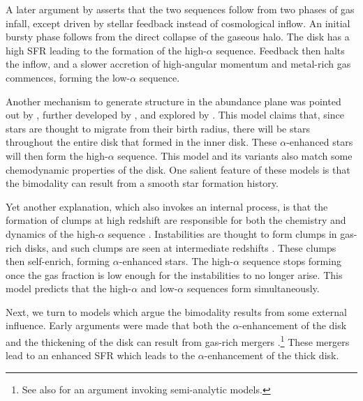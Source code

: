 \documentclass[linenumbers, twocolumn]{aastex631}
\begin{document}
A later argument by \citet{2021MNRAS.501.5176K} asserts that the two sequences follow from two phases of gas infall, except driven by stellar feedback instead of cosmological inflow. An initial bursty phase follows from the direct collapse of the gaseous halo. The disk has a high SFR leading to the formation of the high-$\alpha$ sequence. Feedback then halts the inflow, and a slower accretion of high-angular momentum and metal-rich gas commences, forming the low-$\alpha$ sequence.

Another mechanism to generate structure in the abundance plane was pointed out by \citet{2009MNRAS.396..203S}, further developed by \citet{2021MNRAS.507.5882S,2023MNRAS.523.3791C}, and explored by \citet{2011ApJ...737....8L,2021MNRAS.508.4484J}. This model claims that, since stars are thought to migrate from their birth radius, there will be stars throughout the entire disk that formed in the inner disk. These $\alpha$-enhanced stars will then form the high-$\alpha$ sequence. This model and its variants also match some chemodynamic properties of the disk. One salient feature of these models is that the bimodality can result from a smooth star formation history.

Yet another explanation, which also invokes an internal process, is that the formation of clumps at high redshift are responsible for both the chemistry and dynamics of the high-$\alpha$ sequence \citep{2019MNRAS.484.3476C,2020MNRAS.492.4716B,2021MNRAS.502..260B,2023ApJ...953..128G}. Instabilities are thought to form clumps in gas-rich disks, and such clumps are seen at intermediate redshifts \citep[$z\sim2$;][]{2005ApJ...627..632E,2007ApJ...658..763E}. These clumps then self-enrich, forming $\alpha$-enhanced stars. The high-$\alpha$ sequence stops forming once the gas fraction is low enough for the instabilities to no longer arise. This model predicts that the high-$\alpha$ and low-$\alpha$ sequences form simultaneously.

Next, we turn to models which argue the bimodality results from some external influence. Early arguments were made that both the $\alpha$-enhancement of the disk and the thickening of the disk can result from gas-rich mergers \citep{2004ApJ...612..894B,2005ApJ...630..298B,2007ApJ...658...60B,2010MNRAS.402.1489R}.\footnote{See also \citet{2009MNRAS.400.1347C} for an argument invoking semi-analytic models.} These mergers lead to an enhanced SFR which leads to the $\alpha$-enhancement of the thick disk.
\end{document}

